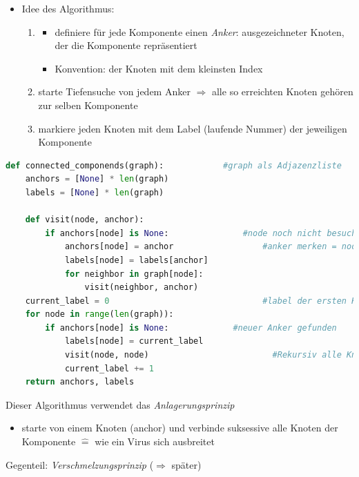 \documentclass[11pt, fleqn]{scrreprt}
\begin{document}
\begin{itemize}
			\item Idee des Algorithmus: 
			\begin{enumerate}
			\item 
			\begin{itemize}
			\item definiere für jede Komponente einen \emph{Anker}: ausgezeichneter Knoten, der die Komponente repräsentiert
			\item Konvention: der Knoten mit dem kleinsten Index
			\end{itemize}
			\item starte Tiefensuche von jedem Anker $\Rightarrow$ alle so erreichten Knoten gehören zur selben Komponente
			\item markiere jeden Knoten mit dem Label (laufende Nummer) der jeweiligen Komponente
			\end{enumerate}
			\end{itemize}
			
			\begin{lstlisting}[language=Python]
def connected_componends(graph): 			#graph als Adjazenzliste
	anchors = [None] * len(graph)
	labels = [None] * len(graph)

	def visit(node, anchor):
		if anchors[node] is None:   			#node noch nicht besucht
			anchors[node] = anchor  				#anker merken = node als visited markiert
			labels[node] = labels[anchor]
			for neighbor in graph[node]:
				visit(neighbor, anchor)
	current_label = 0       						#label der ersten Komponente
	for node in range(len(graph)):
		if anchors[node] is None:  			  #neuer Anker gefunden
			labels[node] = current_label
			visit(node, node)  						  #Rekursiv alle Knoten der ZK von node besuchen
			current_label += 1
	return anchors, labels
			\end{lstlisting}
			Dieser Algorithmus verwendet das \emph{Anlagerungsprinzip}
			\begin{itemize}
				\item starte von einem Knoten (anchor) und verbinde suksessive alle Knoten der Komponente $\widehat{=}$ wie ein Virus sich ausbreitet
			\end{itemize}
			Gegenteil: \emph{Verschmelzungsprinzip} ($\Rightarrow$ später)\\
			
\end{document}
